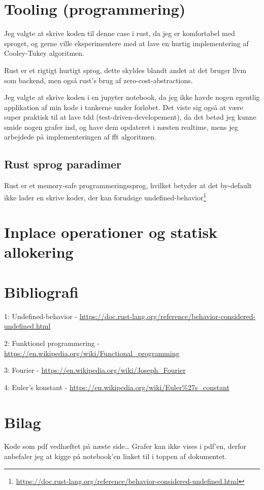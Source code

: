 \documentclass[11pt,a4paper]{article}
\begin{document}
\section{Tooling (programmering)}
\label{sec:orgc753127}
Jeg valgte at skrive koden til denne case i rust, da jeg er komfortabel med sproget,
og gerne ville eksperimentere med at lave en hurtig implementering af Cooley-Tukey algoritmen.

Rust er et rigtigt hurtigt sprog, dette skyldes blandt andet at det bruger llvm som backend,
men også rust's brug af zero-cost-abstractions.

Jeg valgte at skrive koden i en jupyter notebook, da jeg ikke havde nogen egentlig
applikation af min kode i tankerne under forløbet.
Det viste sig også at være super praktisk til at lave tdd (test-driven-developement),
da det betød jeg kunne smide nogen grafer ind, og have dem opdateret i næsten realtime,
mens jeg arbejdede på implementeringen af fft algoritmen.

\subsection{Rust sprog paradimer}
\label{sec:orgffa3d81}
Rust er et memory-safe programmeringssprog,
hvilket betyder at det by-default ikke lader en skrive koder, der kan forudsige undefined-behavior\footnote{\url{https://doc.rust-lang.org/reference/behavior-considered-undefined.html}}

\section{Inplace operationer og statisk allokering}
\label{sec:org7ad1192}

\section{Bibliografi}
\label{sec:orgc7f9d28}

1: Undefined-behavior - \url{https://doc.rust-lang.org/reference/behavior-considered-undefined.html}

2: Funktionel programmering - \url{https://en.wikipedia.org/wiki/Functional\_programming}

3: Fourier - \url{https://en.wikipedia.org/wiki/Joseph\_Fourier}

4: Euler's konstant - \url{https://en.wikipedia.org/wiki/Euler\%27s\_constant}


\section{Bilag}
\label{sec:org593822a}

Kode som pdf vedhæftet på næste side\ldots{}
Grafer kan ikke vises i pdf'en, derfor anbefaler jeg at kigge på notebook'en linket til i toppen af dokumentet.


\end{document}
